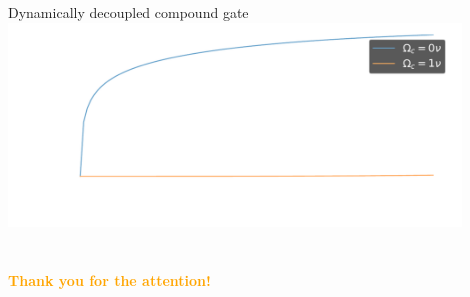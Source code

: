 \documentclass[aspectratio=169]{beamer}
\begin{document}
	\begin{frame}{Dynamically decoupled compound gate}
		\centering
		\includegraphics[width=0.9\textwidth]{Dynamical_decoupling.pdf}
	\end{frame}



    \section{}
    \begin{frame}{}
        \centering
            \Huge\bfseries
        \textcolor{orange}{Thank you for the attention!}
    \end{frame}
\end{document}
